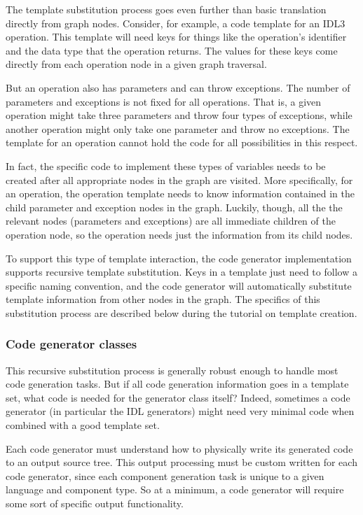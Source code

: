 The template substitution process goes even further than basic translation
directly from graph nodes. Consider, for example, a code template for an IDL3
operation. This template will need keys for things like the operation's
identifier and the data type that the operation returns. The values for these
keys come directly from each operation node in a given graph traversal.

But an operation also has parameters and can throw exceptions. The number of
parameters and exceptions is not fixed for all operations. That is, a given
operation might take three parameters and throw four types of exceptions, while
another operation might only take one parameter and throw no exceptions. The
template for an operation cannot hold the code for all possibilities in this
respect.

In fact, the specific code to implement these types of variables needs to be
created after all appropriate nodes in the graph are visited. More specifically,
for an operation, the operation template needs to know information contained in
the child parameter and exception nodes in the graph. Luckily, though, all the
the relevant nodes (parameters and exceptions) are all immediate children of the
operation node, so the operation needs just the information from its child
nodes.

To support this type of template interaction, the code generator implementation
supports recursive template substitution. Keys in a template just need to follow
a specific naming convention, and the code generator will automatically
substitute template information from other nodes in the graph. The specifics of
this substitution process are described below during the tutorial on template
creation.

\subsubsection{Code generator classes}

This recursive substitution process is generally robust enough to handle most
code generation tasks. But if all code generation information goes in a template
set, what code is needed for the generator class itself? Indeed, sometimes a
code generator (in particular the IDL generators) might need very minimal code
when combined with a good template set.

Each code generator must understand how to physically write its generated code
to an output source tree. This output processing must be custom written for each
code generator, since each component generation task is unique to a given
language and component type. So at a minimum, a code generator will require some
sort of specific output functionality.

